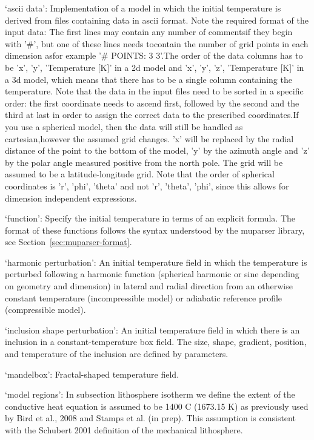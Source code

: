 \begin{itemize}
`ascii data': Implementation of a model in which the initial temperature is derived from files containing data in ascii format. Note the required format of the input data: The first lines may contain any number of commentsif they begin with '#', but one of these lines needs tocontain the number of grid points in each dimension asfor example '# POINTS: 3 3'.The order of the data columns has to be 'x', 'y', 'Temperature [K]' in a 2d model and  'x', 'y', 'z', 'Temperature [K]' in a 3d model, which means that there has to be a single column containing the temperature. Note that the data in the input files need to be sorted in a specific order: the first coordinate needs to ascend first, followed by the second and the third at last in order to assign the correct data to the prescribed coordinates.If you use a spherical model, then the data will still be handled as cartesian,however the assumed grid changes. 'x' will be replaced by the radial distance of the point to the bottom of the model, 'y' by the azimuth angle and 'z' by the polar angle measured positive from the north pole. The grid will be assumed to be a latitude-longitude grid. Note that the order of spherical coordinates is 'r', 'phi', 'theta' and not 'r', 'theta', 'phi', since this allows for dimension independent expressions. 

`function': Specify the initial temperature in terms of an explicit formula. The format of these functions follows the syntax understood by the muparser library, see Section~\ref{sec:muparser-format}.

`harmonic perturbation': An initial temperature field in which the temperature is perturbed following a harmonic function (spherical harmonic or sine depending on geometry and dimension) in lateral and radial direction from an otherwise constant temperature (incompressible model) or adiabatic reference profile (compressible model).

`inclusion shape perturbation': An initial temperature field in which there is an inclusion in a constant-temperature box field. The size, shape, gradient, position, and temperature of the inclusion are defined by parameters.

`mandelbox': Fractal-shaped temperature field.

`model regions': In subsection lithosphere isotherm we define the extent of the conductive heat equation is assumed to be 1400 C (1673.15 K) as previously used by Bird et al., 2008 and Stamps et al. (in prep). This assumption is consistent with the Schubert 2001 definition of the mechanical lithosphere.


\end{itemize}
